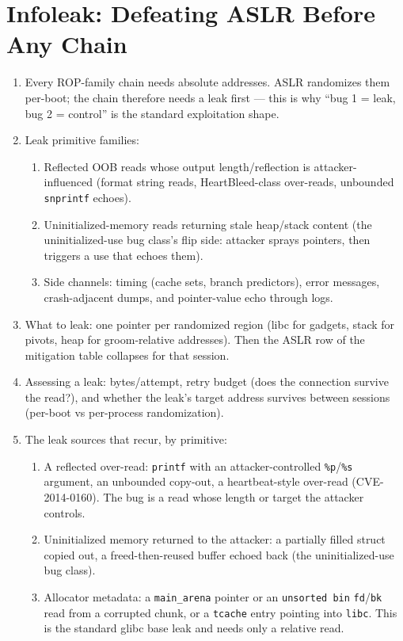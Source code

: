 \documentclass[12pt]{Training}
\begin{document}
\section*{Infoleak: Defeating ASLR Before Any Chain}
\begin{enumerate}
    \item Every ROP-family chain needs absolute addresses. ASLR randomizes them per-boot; the chain therefore needs a leak first --- this is why ``bug 1 = leak, bug 2 = control'' is the standard exploitation shape.
    \item Leak primitive families:
    \begin{enumerate}
        \item Reflected OOB reads whose output length/reflection is attacker-influenced (format string reads, HeartBleed-class over-reads, unbounded \lstinline{snprintf} echoes).
        \item Uninitialized-memory reads returning stale heap/stack content (the uninitialized-use bug class's flip side: attacker sprays pointers, then triggers a use that echoes them).
        \item Side channels: timing (cache sets, branch predictors), error messages, crash-adjacent dumps, and pointer-value echo through logs.
    \end{enumerate}
    \item What to leak: one pointer per randomized region (libc for gadgets, stack for pivots, heap for groom-relative addresses). Then the ASLR row of the mitigation table collapses for that session.
    \item Assessing a leak: bytes/attempt, retry budget (does the connection survive the read?), and whether the leak's target address survives between sessions (per-boot vs per-process randomization).
    \item The leak sources that recur, by primitive:
    \begin{enumerate}
        \item A reflected over-read: \lstinline{printf} with an attacker-controlled \lstinline{%p}/\lstinline{%s} argument, an unbounded copy-out, a heartbeat-style over-read (CVE-2014-0160). The bug is a read whose length or target the attacker controls.
        \item Uninitialized memory returned to the attacker: a partially filled struct copied out, a freed-then-reused buffer echoed back (the uninitialized-use bug class).
        \item Allocator metadata: a \lstinline{main_arena} pointer or an \lstinline{unsorted bin} \lstinline{fd}/\lstinline{bk} read from a corrupted chunk, or a \lstinline{tcache} entry pointing into \lstinline{libc}. This is the standard glibc base leak and needs only a relative read.

\end{enumerate}
\end{enumerate}
\end{document}
